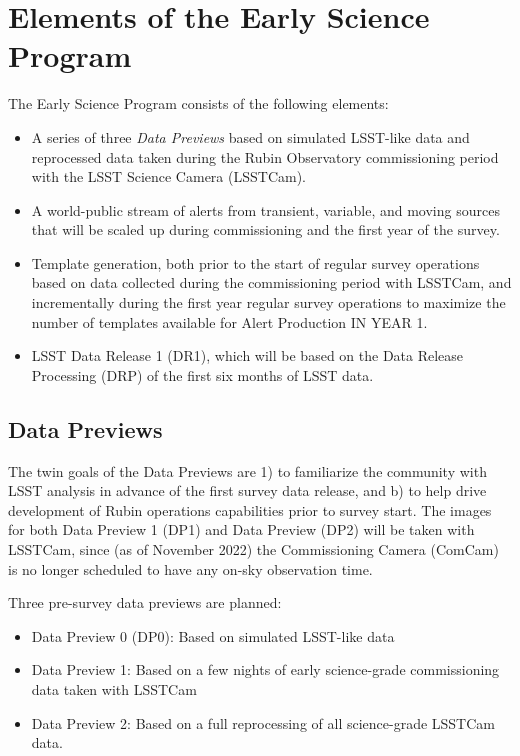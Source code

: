 \section{Elements of the Early Science Program}

The Early Science Program consists of the following elements:
\begin{itemize}
	\item A series of three \emph{Data Previews} based on simulated LSST-like data and reprocessed data taken during the Rubin Observatory commissioning period with the LSST Science Camera (LSSTCam).
	\item A world-public stream of alerts from transient, variable, and moving sources that will be scaled up during commissioning and the first year of the survey.
	\item Template generation, both prior to the start of regular survey operations based on data collected during the commissioning period with LSSTCam, and incrementally during the first year regular survey operations  to maximize the number of templates available for Alert Production IN YEAR 1.
	\item LSST Data Release 1 (DR1), which will be based on the Data Release Processing (DRP) of the first six months of LSST data.
\end{itemize}

\subsection{Data Previews}

The twin goals of the Data Previews are 1) to familiarize the community with LSST analysis in advance of the first survey data release, and b) to help drive development of Rubin operations capabilities prior to survey start.
The images for both Data Preview 1 (DP1) and Data Preview (DP2) will be taken with LSSTCam, since (as of November 2022) the Commissioning Camera (ComCam) is no longer scheduled to have any on-sky observation time.

Three pre-survey data previews are planned:
\begin{itemize}
\item  Data Preview 0 (DP0): Based on simulated LSST-like data
\item  Data Preview 1: Based on a few nights of early science-grade commissioning data taken with LSSTCam
\item Data Preview 2: Based on a full reprocessing of all science-grade LSSTCam data.

\end{itemize}

